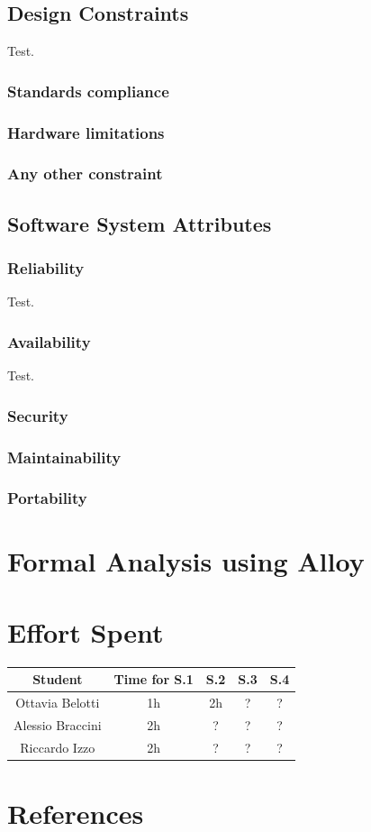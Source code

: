 \documentclass[table, 12pt]{article}
\begin{document}
\subsection{Design Constraints}
Test.

\subsubsection{Standards compliance}
\subsubsection{Hardware limitations}
\subsubsection{Any other constraint}

\subsection{Software System Attributes}
\subsubsection{Reliability}
Test.

\subsubsection{Availability}
Test.

\subsubsection{Security}
\subsubsection{Maintainability}
\subsubsection{Portability}

\section{Formal Analysis using Alloy}
\section{Effort Spent}
    \begin{tabular}{| c || c | c| c| c |}
        \hline
        Student & Time for S.1 & S.2 & S.3 & S.4 \\ \hline
        Ottavia Belotti & 1h & 2h & ? & ? \\
        Alessio Braccini & 2h & ? & ? & ? \\
        Riccardo Izzo & 2h & ? & ? & ? \\
        \hline
    \end{tabular}

\section{References}
\end{document}
